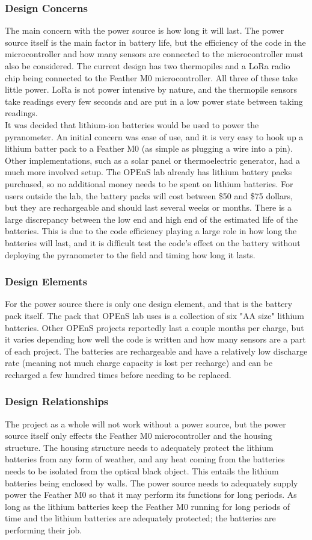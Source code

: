 \documentclass[10pt,draftclsnofoot,onecolumn,letterpaper]{article}
\begin{document}
\subsubsection{Design Concerns}
The main concern with the power source is how long it will last. The power source itself is the main factor in battery life, but the efficiency of the code in the microcontroller and how many sensors are connected to the microcontroller must also be considered. The current design has two thermopiles and a LoRa radio chip being connected to the Feather M0 microcontroller. All three of these take little power. LoRa is not power intensive by nature, and the thermopile sensors take readings every few seconds and are put in a low power state between taking readings.\\It was decided that lithium-ion batteries would be used to power the pyranometer. An initial concern was ease of use, and it is very easy to hook up a lithium batter pack to a Feather M0 (as simple as plugging a wire into a pin). Other implementations, such as a solar panel or thermoelectric generator, had a much more involved setup. The OPEnS lab already has lithium battery packs purchased, so no additional money needs to be spent on lithium batteries. For users outside the lab, the battery packs will cost between \$50 and \$75 dollars, but they are rechargeable and should last several weeks or months. There is a large discrepancy between the low end and high end of the estimated life of the batteries. This is due to the code efficiency playing a large role in how long the batteries will last, and it is difficult test the code's effect on the battery without deploying the pyranometer to the field and timing how long it lasts. 
\subsubsection{Design Elements}
For the power source there is only one design element, and that is the battery pack itself. The pack that OPEnS lab uses is a collection of six "AA size" lithium batteries. Other OPEnS projects reportedly last a couple months per charge, but it varies depending how well the code is written and how many sensors are a part of each project. The batteries are rechargeable and have a relatively low discharge rate (meaning not much charge capacity is lost per recharge) and can be recharged a few hundred times before needing to be replaced. 
\subsubsection{Design Relationships}
The project as a whole will not work without a power source, but the power source itself only effects the Feather M0 microcontroller and the housing structure. The housing structure needs to adequately protect the lithium batteries from any form of weather, and any heat coming from the batteries needs to be isolated from the optical black object. This entails the lithium batteries being enclosed by walls. The power source needs to adequately supply power the Feather M0 so that it may perform its functions for long periods. As long as the lithium batteries keep the Feather M0 running for long periods of time and the lithium batteries are adequately protected; the batteries are performing their job.
\end{document}
